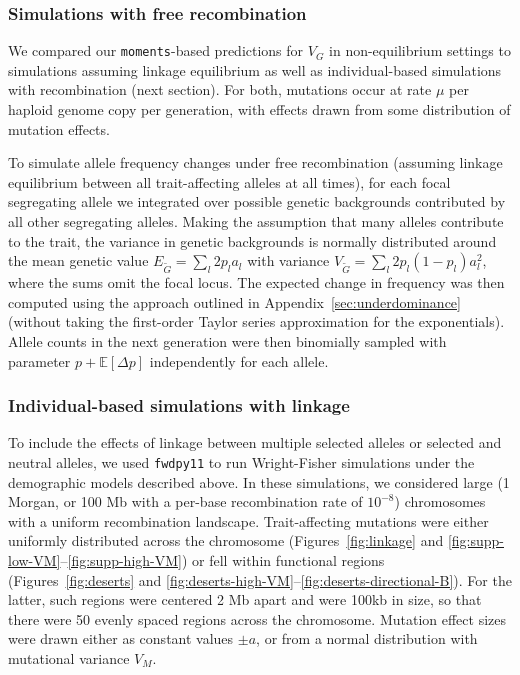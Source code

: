 \documentclass{article}
\newcommand{\E}{\mathbb{E}}
\newcommand{\moments}{\texttt{moments}\xspace}
\newcommand{\fwdpy}{\texttt{fwdpy11}\xspace}
\begin{document}
\subsubsection*{Simulations with free recombination}

We compared our \moments-based predictions for $V_G$ in non-equilibrium
settings to simulations assuming linkage equilibrium as well as
individual-based simulations with recombination (next section). For both,
mutations occur at rate $\mu$ per haploid genome copy per generation, with
effects drawn from some distribution of mutation effects.

To simulate allele frequency changes under free recombination (assuming linkage
equilibrium between all trait-affecting alleles at all times), for each focal
segregating allele we integrated over possible genetic backgrounds contributed
by all other segregating alleles. Making the assumption that many alleles
contribute to the trait, the variance in genetic backgrounds is normally
distributed around the mean genetic value $E_{\tilde{G}}=\sum_l 2p_l a_l$ with
variance $V_{\tilde{G}}=\sum_l 2p_l(1-p_l)a_l^2$, where the sums omit the focal
locus. The expected change in frequency was then computed using the approach
outlined in Appendix~\ref{sec:underdominance} (without taking the first-order
Taylor series approximation for the exponentials). Allele counts in the next
generation were then binomially sampled with parameter $p+\E[\Delta p]$
independently for each allele.

\subsubsection*{Individual-based simulations with linkage}

To include the effects of linkage between multiple selected alleles or selected
and neutral alleles, we used \fwdpy \citep{thornton2019polygenic} to run
Wright-Fisher simulations under the demographic models described above. In
these simulations, we considered large (1 Morgan, or 100 Mb with a per-base
recombination rate of $10^{-8}$) chromosomes with a uniform recombination
landscape. Trait-affecting mutations were either uniformly distributed across
the chromosome (Figures~\ref{fig:linkage} and
\ref{fig:supp-low-VM}--\ref{fig:supp-high-VM}) or fell within functional
regions (Figures~\ref{fig:deserts} and
\ref{fig:deserts-high-VM}--\ref{fig:deserts-directional-B}). For the latter,
such regions were centered 2 Mb apart and were 100kb in size, so that there
were 50 evenly spaced regions across the chromosome. Mutation effect sizes were
drawn either as constant values $\pm a$, or from a normal distribution with
mutational variance $V_M$.
\end{document}
